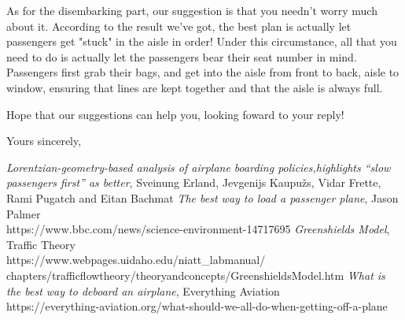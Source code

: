 \documentclass{article}
\begin{document}
	As for the disembarking part, our suggestion is that you needn't worry much about it. According to the result we've got, the best plan is actually let passengers get "stuck" in the aisle in order! Under this circumstance, all that you need to do is actually let the passengers bear their seat number in mind. Passengers first grab their bags, and get into the aisle from front to back, aisle to window, ensuring that lines are kept together and that the aisle is always full.

	Hope that our suggestions can help you, looking foward to your reply!

	\noindent Yours sincerely,

	\noindent {}


	\newpage
	\thispagestyle{empty}
	\renewcommand\refname{References}
	\begin{thebibliography}{100}
	 \textit{Lorentzian-geometry-based analysis of airplane boarding policies,highlights “slow passengers first” as better},
	Sveinung Erland, Jevgenijs Kaupužs, Vidar Frette, Rami Pugatch and  Eitan Bachmat
	 \textit{The best way to load a passenger plane}, Jason Palmer\\
	https://www.bbc.com/news/science-environment-14717695
	 \textit{Greenshields Model}, Traffic Theory\\
	https://www.webpages.uidaho.edu/niatt\_labmanual/\\chapters/trafficflowtheory/theoryandconcepts/GreenshieldsModel.htm
	 \textit{What is the best way to deboard an airplane}, Everything Aviation\\
	https://everything-aviation.org/what-should-we-all-do-when-getting-off-a-plane
	\end{thebibliography}
\end{document}
